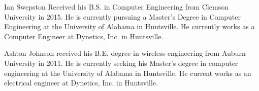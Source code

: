 \documentclass[journal]{IEEEtran}
\begin{document}
 

% 

\begin{IEEEbiographynophoto}{Ian Swepston}
 Received his B.S. in Computer Engineering from Clemson University in 2015. He is currently pursuing a Master's Degree in Computer Engineering at the University of Alabama in Huntsville. He currently works as a Computer Engineer at Dynetics, Inc. in Huntsville.
\end{IEEEbiographynophoto}

\begin{IEEEbiographynophoto}{Ashton Johnson}
 received his B.E. degree in wireless engineering from Auburn University in 2011. He is currently seeking his Master's degree in computer engineering at the University of Alabama in Huntsville. He current works as an electrical engineer at Dynetics, Inc. in Huntsville. 
\end{IEEEbiographynophoto}







\end{document}
